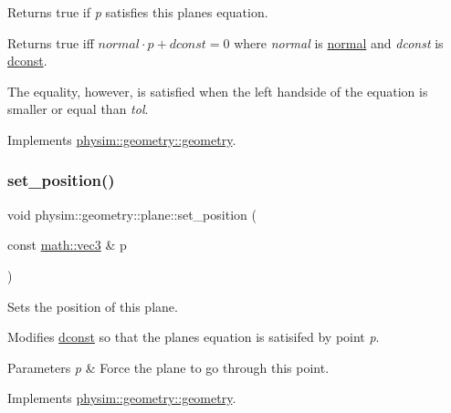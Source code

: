 Returns true if {\itshape p} satisfies this plane\textquotesingle{}s equation. 

Returns true iff $normal \cdot p + dconst = 0$ where {\itshape normal} is \hyperlink{classphysim_1_1geometry_1_1plane_a51656a31e9c941542f17d47d2ab976bf}{normal} and {\itshape dconst} is \hyperlink{classphysim_1_1geometry_1_1plane_aa29c5a4d71a1ee195a770e17b6ccdc87}{dconst}.

The equality, however, is satisfied when the left handside of the equation is smaller or equal than {\itshape tol}. 

Implements \hyperlink{classphysim_1_1geometry_1_1geometry_a8ae67bba78a06e3c41b7f5b5903b897d}{physim\+::geometry\+::geometry}.

\mbox{\label{classphysim_1_1geometry_1_1plane_a9de66b1c50ea9d34a8142e0a48751692}} 
\subsubsection{\texorpdfstring{set\+\_\+position()}{set\_position()}}
{\footnotesize\ttfamily void physim\+::geometry\+::plane\+::set\+\_\+position (\begin{DoxyParamCaption}\item[{const \hyperlink{structphysim_1_1math_1_1vec3}{math\+::vec3} \&}]{p }\end{DoxyParamCaption})\hspace{0.3cm}{\ttfamily [virtual]}}



Sets the position of this plane. 

Modifies \hyperlink{classphysim_1_1geometry_1_1plane_aa29c5a4d71a1ee195a770e17b6ccdc87}{dconst} so that the plane\textquotesingle{}s equation is satisifed by point {\itshape p}. 
\begin{DoxyParams}{Parameters}
{\em p} & Force the plane to go through this point. \\
\hline
\end{DoxyParams}


Implements \hyperlink{classphysim_1_1geometry_1_1geometry_a45bffd27f5e8d59375762cf7987625e1}{physim\+::geometry\+::geometry}.

\mbox{\label{classphysim_1_1geometry_1_1plane_aaa6388a8a8fc289fc15d417e31a2d7a2}} 
